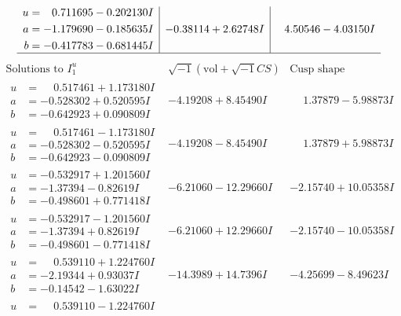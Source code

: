 \documentclass[1p]{elsarticle_modified}
\theoremstyle{definition}
\newcommand{\I}{\sqrt{-1}}
\begin{document}
$$\begin{array}{c|c|c}
\begin{aligned}
u &= \phantom{-}0.711695 - 0.202130 I \\
a &= -1.179690 - 0.185635 I \\
b &= -0.417783 - 0.681445 I\end{aligned}
 & -0.38114 + 2.62748 I & \phantom{-}4.50546 - 4.03150 I\\
 \hline 
 \end{array}$$\newpage$$\begin{array}{c|c|c}  
\text{Solutions to }I^u_{1}& \I (\text{vol} + \sqrt{-1}CS) & \text{Cusp shape}\\
 \hline 
\begin{aligned}
u &= \phantom{-}0.517461 + 1.173180 I \\
a &= -0.528302 + 0.520595 I \\
b &= -0.642923 + 0.090809 I\end{aligned}
 & -4.19208 + 8.45490 I & \phantom{-}1.37879 - 5.98873 I \\ \hline\begin{aligned}
u &= \phantom{-}0.517461 - 1.173180 I \\
a &= -0.528302 - 0.520595 I \\
b &= -0.642923 - 0.090809 I\end{aligned}
 & -4.19208 - 8.45490 I & \phantom{-}1.37879 + 5.98873 I \\ \hline\begin{aligned}
u &= -0.532917 + 1.201560 I \\
a &= -1.37394 - 0.82619 I \\
b &= -0.498601 + 0.771418 I\end{aligned}
 & -6.21060 - 12.29660 I & -2.15740 + 10.05358 I \\ \hline\begin{aligned}
u &= -0.532917 - 1.201560 I \\
a &= -1.37394 + 0.82619 I \\
b &= -0.498601 - 0.771418 I\end{aligned}
 & -6.21060 + 12.29660 I & -2.15740 - 10.05358 I \\ \hline\begin{aligned}
u &= \phantom{-}0.539110 + 1.224760 I \\
a &= -2.19344 + 0.93037 I \\
b &= -0.14542 - 1.63022 I\end{aligned}
 & -14.3989 + 14.7396 I & -4.25699 - 8.49623 I \\ \hline\begin{aligned}
u &= \phantom{-}0.539110 - 1.224760 I \\

\end{aligned}
\end{array}$$
\end{document}
